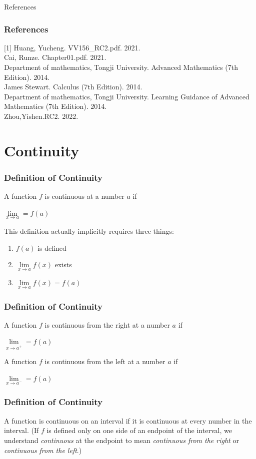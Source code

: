 \documentclass{beamer}
\begin{document}
	

	
	\begin{frame}{References}
	    \frametitle{References}
		[1] Huang, Yucheng. VV156\_RC2.pdf. 2021.\\
		\bigskip
		[2] Cai, Runze. Chapter01.pdf. 2021.\\
		\bigskip
		[3] Department of mathematics, Tongji University. Advanced Mathematics (7th Edition). 2014.\\
		\bigskip
		[4] James Stewart. Calculus (7th Edition). 2014.\\
		\bigskip
		[5] Department of mathematics, Tongji University. Learning Guidance of Advanced Mathematics (7th Edition). 2014.\\
		\bigskip
		[6]Zhou,Yishen.RC2. 2022.
	\end{frame}
\section{Continuity}
\begin{frame}
		\frametitle{Definition of Continuity}
		A function $f$ is continuous at a number $a$ if
		\begin{center}
			$\lim\limits_{\textit{x} \to a} = f(a)$
		\end{center}
		This definition actually implicitly requires three things:
		\begin{enumerate}
			\item $f(a)$ is defined
			\item $\lim\limits_{\textit{x} \to a}f(x)$ exists
			\item $\lim\limits_{\textit{x} \to a}f(x) = f(a)$
		\end{enumerate}

		\frametitle{Definition of Continuity}
		A function $f$ is continuous from the right at a number $a$ if
		\begin{center}
			$\lim\limits_{\textit{x} \to a^{+}} = f(a)$
		\end{center}
		A function $f$ is continuous from the left at a number $a$ if
		\begin{center}
			$\lim\limits_{\textit{x} \to a^{-}} = f(a)$
		\end{center}
	\end{frame}
	\begin{frame}
		\frametitle{Definition of Continuity}
		A function is continuous on an interval if it is continuous at \alert{every number in the interval}. (If $f$ is defined only on one side of an endpoint of the interval, we understand \textit{continuous} at the endpoint to mean \textit{continuous from the right} or \textit{continuous from the left}.)
	\end{frame}
	
\end{document}

